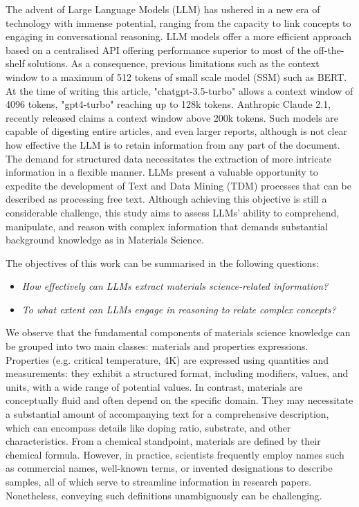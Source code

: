 \documentclass[a4paper]{article}
\begin{document}
The advent of Large Language Models (LLM) has ushered in a new era of technology with immense potential, ranging from the capacity to link concepts to engaging in conversational reasoning.
LLM models offer a more efficient approach based on a centralised API offering performance superior to most of the off-the-shelf solutions. 
As a consequence, previous limitations such as the context window to a maximum of 512 tokens of small scale model (SSM) such as BERT. 
At the time of writing this article, "chatgpt-3.5-turbo" allows a context window of 4096 tokens, "gpt4-turbo" reaching up to 128k tokens. Anthropic Claude 2.1, recently released claims a context window above 200k tokens.  
Such models are capable of digesting entire articles, and even larger reports, although is not clear how effective the LLM is to retain information from any part of the document.
The demand for structured data necessitates the extraction of more intricate information in a flexible manner. 
LLMs present a valuable opportunity to expedite the development of Text and Data Mining (TDM) processes that can be described as processing free text. 
Although achieving this objective is still a considerable challenge, this study aims to assess LLMs' ability to comprehend, manipulate, and reason with complex information that demands substantial background knowledge as in Materials Science. 

The objectives of this work can be summarised in the following questions: 
\begin{itemize}
    \item \textit{How effectively can LLMs extract materials science-related information?}
    \item \textit{To what extent can LLMs engage in reasoning to relate complex concepts?}
\end{itemize}

We observe that the fundamental components of materials science knowledge can be grouped into two main classes: materials and properties expressions. 
Properties (e.g. critical temperature, 4K) are expressed using quantities and measurements: they exhibit a structured format, including modifiers, values, and units, with a wide range of potential values. 
In contrast, materials are conceptually fluid and often depend on the specific domain. They may necessitate a substantial amount of accompanying text for a comprehensive description, which can encompass details like doping ratio, substrate, and other characteristics. 
From a chemical standpoint, materials are defined by their chemical formula. 
However, in practice, scientists frequently employ names such as commercial names, well-known terms, or invented designations to describe samples, all of which serve to streamline information in research papers. Nonetheless, conveying such definitions unambiguously can be challenging.
\end{document}

